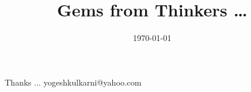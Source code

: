 \documentclass[xcolor=dvipsnames,compress,t,pdf]{beamer}
\title[\hspace{4cm} \insertframenumber /\inserttotalframenumber]
{Gems from Thinkers \ldots}
\date[2020]{\today}
\begin{document}
\begin{frame}
\titlepage
\end{frame}






\begin{frame}[c]{}
Thanks ...
\vspace{5mm}
yogeshkulkarni@yahoo.com
\end{frame}
\end{document}
